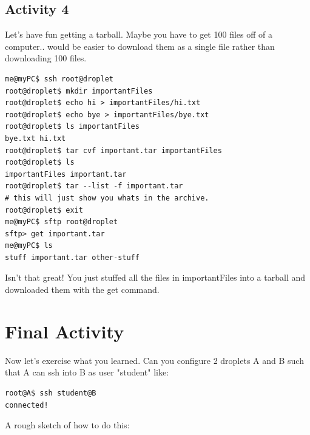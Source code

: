 \documentclass[12pt]{article}
\begin{document}
\subsection{Activity 4}
Let's have fun getting a tarball. Maybe you have to get 100 files off of a computer.. would be easier to download them as a single file rather than downloading 100 files.

\begin{lstlisting}[style=term]
me@myPC$ ssh root@droplet
root@droplet$ mkdir importantFiles
root@droplet$ echo hi > importantFiles/hi.txt
root@droplet$ echo bye > importantFiles/bye.txt
root@droplet$ ls importantFiles
bye.txt hi.txt
root@droplet$ tar cvf important.tar importantFiles
root@droplet$ ls
importantFiles important.tar
root@droplet$ tar --list -f important.tar
# this will just show you whats in the archive.
root@droplet$ exit
me@myPC$ sftp root@droplet
sftp> get important.tar
me@myPC$ ls
stuff important.tar other-stuff
\end{lstlisting}

Isn't that great! You just stuffed all the files in importantFiles into a tarball and downloaded them with the get command.

\section{Final Activity}
Now let's exercise what you learned. Can you configure 2 droplets A and B such that A can ssh into B as user "student" like:

\begin{lstlisting}[style=term,label=listing:ssh,caption=Goal: Make this work]
root@A$ ssh student@B
connected!
\end{lstlisting}

A rough sketch of how to do this:
\end{document}
